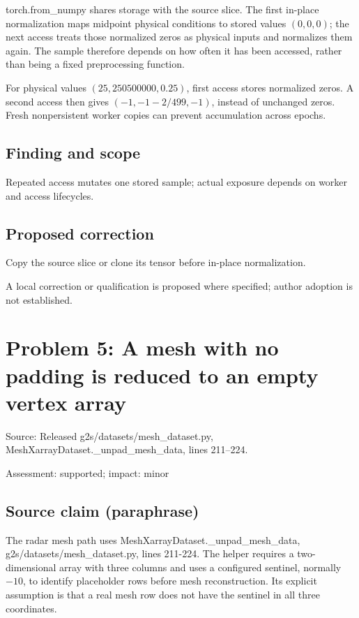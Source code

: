\documentclass[11pt]{article}
\begin{document}
torch.from\_numpy shares storage with the source slice. The first in-place normalization maps midpoint physical conditions to stored values \((0,0,0)\); the next access treats those normalized zeros as physical inputs and normalizes them again. The sample therefore depends on how often it has been accessed, rather than being a fixed preprocessing function.

For physical values \((25,250500000,0.25)\), first access stores normalized zeros. A second access then gives \((-1,-1-2/499,-1)\), instead of unchanged zeros. Fresh nonpersistent worker copies can prevent accumulation across epochs.

\subsection*{Finding and scope}

Repeated access mutates one stored sample; actual exposure depends on worker and access lifecycles.

\subsection*{Proposed correction}

Copy the source slice or clone its tensor before in-place normalization.

A local correction or qualification is proposed where specified; author adoption is not established.

\section*{Problem 5: A mesh with no padding is reduced to an empty vertex array}

Source: Released g2s/datasets/mesh\_dataset.py, MeshXarrayDataset.\_unpad\_mesh\_data, lines 211–224.

Assessment: supported; impact: minor

\subsection*{Source claim (paraphrase)}

The radar mesh path uses MeshXarrayDataset.\_unpad\_mesh\_data, g2s/datasets/mesh\_dataset.py, lines 211-224. The helper requires a two-dimensional array with three columns and uses a configured sentinel, normally \(-10\), to identify placeholder rows before mesh reconstruction. Its explicit assumption is that a real mesh row does not have the sentinel in all three coordinates.
\end{document}
